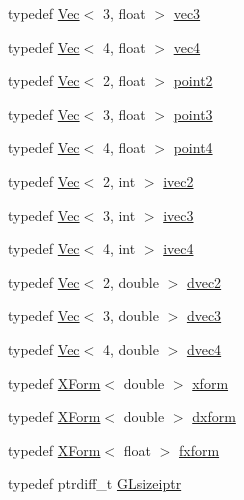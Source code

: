 \begin{DoxyCompactItemize}
\item 
typedef \hyperlink{classtrimesh_1_1Vec}{Vec}$<$ 3, float $>$ \hyperlink{namespacetrimesh_a98336803e5d279cf5f491b205f8c4813}{vec3}
\item 
typedef \hyperlink{classtrimesh_1_1Vec}{Vec}$<$ 4, float $>$ \hyperlink{namespacetrimesh_a3dc1251af351f2561c23c38523db0d36}{vec4}
\item 
typedef \hyperlink{classtrimesh_1_1Vec}{Vec}$<$ 2, float $>$ \hyperlink{namespacetrimesh_aceeb924a83e13a21adecec58dcccfed8}{point2}
\item 
typedef \hyperlink{classtrimesh_1_1Vec}{Vec}$<$ 3, float $>$ \hyperlink{namespacetrimesh_acebb9713d8dfa7328e10196239ca5d4e}{point3}
\item 
typedef \hyperlink{classtrimesh_1_1Vec}{Vec}$<$ 4, float $>$ \hyperlink{namespacetrimesh_a44139b182b9cc1d314b7bce240dc9678}{point4}
\item 
typedef \hyperlink{classtrimesh_1_1Vec}{Vec}$<$ 2, int $>$ \hyperlink{namespacetrimesh_a70e381a5073e5b5555b5c8c168c9375f}{ivec2}
\item 
typedef \hyperlink{classtrimesh_1_1Vec}{Vec}$<$ 3, int $>$ \hyperlink{namespacetrimesh_aac2b29443f1e16cabbb5da4e8a769f27}{ivec3}
\item 
typedef \hyperlink{classtrimesh_1_1Vec}{Vec}$<$ 4, int $>$ \hyperlink{namespacetrimesh_ab9dd19161c2242c73c5c0fb468e21d74}{ivec4}
\item 
typedef \hyperlink{classtrimesh_1_1Vec}{Vec}$<$ 2, double $>$ \hyperlink{namespacetrimesh_adcb23f5ef0a7e8514f6193b6c9747da7}{dvec2}
\item 
typedef \hyperlink{classtrimesh_1_1Vec}{Vec}$<$ 3, double $>$ \hyperlink{namespacetrimesh_a3d3b8c3fb2f53a3b3cbff0a0cd2472a4}{dvec3}
\item 
typedef \hyperlink{classtrimesh_1_1Vec}{Vec}$<$ 4, double $>$ \hyperlink{namespacetrimesh_a5a6ab9e9336d86643e52af143b283c60}{dvec4}
\item 
typedef \hyperlink{classtrimesh_1_1XForm}{X\+Form}$<$ double $>$ \hyperlink{namespacetrimesh_ad504958f2f56e393991b848986a8459f}{xform}
\item 
typedef \hyperlink{classtrimesh_1_1XForm}{X\+Form}$<$ double $>$ \hyperlink{namespacetrimesh_ada17437d42f05ec2e98e3f1286f16fbb}{dxform}
\item 
typedef \hyperlink{classtrimesh_1_1XForm}{X\+Form}$<$ float $>$ \hyperlink{namespacetrimesh_a6dc08ea49881bb2975b7d34e0c07faad}{fxform}
\item 
typedef ptrdiff\+\_\+t \hyperlink{namespacetrimesh_a81f1ae6b94117df73fad0a5577fd01a9}{G\+Lsizeiptr}

\end{DoxyCompactItemize}
